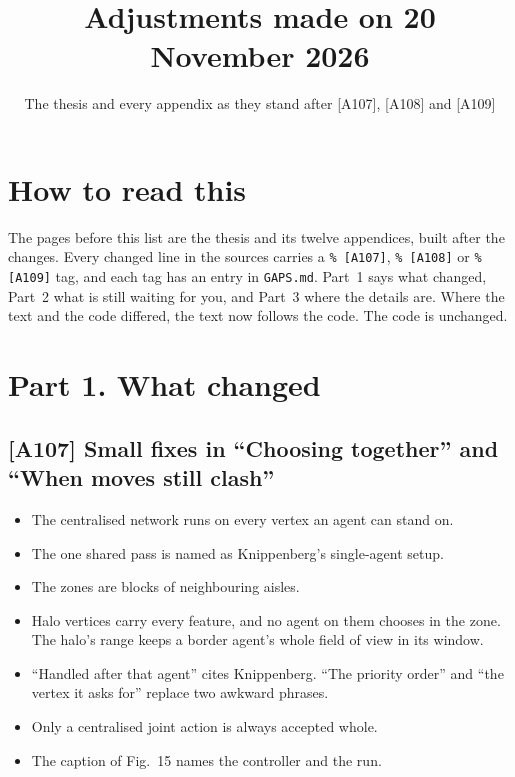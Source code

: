 \documentclass[11pt,a4paper]{article}
\title{Adjustments made on 20 November 2026}
\date{The thesis and every appendix as they stand after [A107], [A108] and [A109]}
\begin{document}
\sloppy
\maketitle

\section*{How to read this}
The pages before this list are the thesis and its twelve appendices, built
after the changes. Every changed line in the sources carries a
\texttt{\% [A107]}, \texttt{\% [A108]} or \texttt{\% [A109]} tag, and each tag
has an entry in \texttt{GAPS.md}. Part~1 says what changed, Part~2 what is
still waiting for you, and Part~3 where the details are. Where the text and
the code differed, the text now follows the code. The code is unchanged.

\section*{Part 1. What changed}

\subsection*{[A107] Small fixes in ``Choosing together'' and ``When moves still clash''}
\begin{itemize}
  \item The centralised network runs on every vertex an agent can stand on.
  \item The one shared pass is named as Knippenberg's single-agent setup.
  \item The zones are blocks of neighbouring aisles.
  \item Halo vertices carry every feature, and no agent on them chooses in the
        zone. The halo's range keeps a border agent's whole field of view in
        its window.
  \item ``Handled after that agent'' cites Knippenberg. ``The priority order''
        and ``the vertex it asks for'' replace two awkward phrases.
  \item Only a centralised joint action is always accepted whole.
  \item The caption of Fig.~15 names the controller and the run.
\end{itemize}
\end{document}
